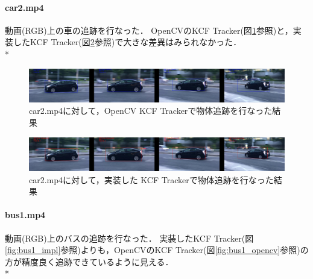 \documentclass[11pt,a4j]{jarticle}
\begin{document}
    \newpage

    \paragraph{car2.mp4}
    動画(RGB)上の車の追跡を行なった．
    OpenCVのKCF Tracker(図\ref{fig:car2_opencv}参照)と，実装したKCF Tracker(図\ref{fig:car2_impl}参照)で大きな差異はみられなかった．
    \\*

    \begin{figure}[hbtp]
      \begin{center}
        \includegraphics[clip,width=12.5cm]{./figures/car2_kcf_opencv.jpg}
        \caption{car2.mp4に対して，OpenCV KCF Trackerで物体追跡を行なった結果}
        \label{fig:car2_opencv}
      \end{center}
    \end{figure}

    \begin{figure}[bhtp]
      \begin{center}
        \includegraphics[clip,width=12.5cm]{./figures/car2_kcf_impl.jpg}
        \caption{car2.mp4に対して，実装した KCF Trackerで物体追跡を行なった結果}
        \label{fig:car2_impl}
      \end{center}
    \end{figure}

    \newpage

    \paragraph{bus1.mp4}
    動画(RGB)上のバスの追跡を行なった．
    実装したKCF Tracker(図\ref{fig:bus1_impl}参照)よりも，OpenCVのKCF Tracker(図\ref{fig:bus1_opencv}参照)の方が精度良く追跡できているように見える．
    \\*
\end{document}
